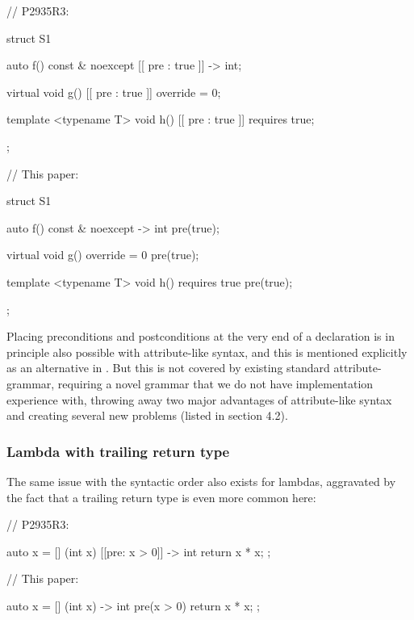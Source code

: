 \begin{minipage}{8cm}
\begin{codeblock}
// P2935R3:

struct S1
{
  auto f() const & noexcept
    [[ pre : true ]] -> int;
    
  virtual void g()
    [[ pre : true ]] override = 0;
  
  template <typename T>
  void h()
    [[ pre : true ]] requires true;
};
\end{codeblock}
\end{minipage}
\begin{minipage}{8cm}
\begin{codeblock}
// This paper:

struct S1
{
  auto f() const & noexcept -> int
    pre(true);
    
  virtual void g() override = 0
    pre(true);

  template <typename T>
  void h() requires true
    pre(true);
};
\end{codeblock}
\end{minipage}


Placing preconditions and postconditions at the very end of a declaration is in principle also possible with attribute-like syntax, and this is mentioned explicitly as an alternative in \cite{P2935R3}. But this is not covered by existing standard attribute-grammar, requiring a novel grammar that we do not have implementation experience with, throwing away two major advantages of attribute-like syntax and creating several new problems (listed in \cite{P2935R3} section 4.2).

\subsubsection{Lambda with trailing return type}
The same issue with the syntactic order also exists for lambdas, aggravated by the fact that a trailing return type is even more common here:


\begin{minipage}{8cm}
\begin{codeblock}
// P2935R3:

auto x = [] (int x)
  [[pre: x > 0]] -> int { 
  return x * x; 
};
\end{codeblock}
\end{minipage}
\begin{minipage}{8cm}
\begin{codeblock}
// This paper:

auto x = [] (int x) -> int 
  pre(x > 0) { 
  return x * x; 
};
\end{codeblock}
\end{minipage}

